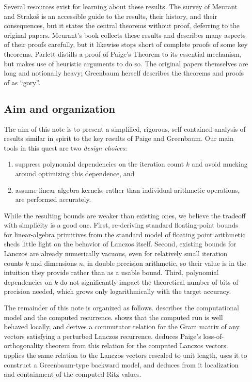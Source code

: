 Several resources exist for learning about these results.
The survey of Meurant and Strako\v{s} \cite{meurant_strakos2006} is an accessible guide to the results, their history, and their consequences, but it states the central theorems without proof, deferring to the original papers.
Meurant's book \cite{meurant2006} collects these results and describes many aspects of their proofs carefully, but it likewise stops short of complete proofs of some key theorems.
Parlett \cite{parlett1998} distills a proof of Paige's Theorem to its essential mechanism, but makes use of heuristic arguments to do so.
The original papers themselves are long and notionally heavy; Greenbaum herself describes the theorems and proofs of \cite{greenbaum1989} as ``gory''.

\subsection{Aim and organization}

The aim of this note is to present a simplified, rigorous, self-contained analysis of results similar in spirit to the key results of Paige and Greenbaum.
Our main tools in this quest are two \emph{design choices}:
\begin{enumerate}[label=(\roman*)]
  \item suppress polynomial dependencies on the iteration count $k$ and avoid mucking around optimizing this dependence, and
  \item assume linear-algebra kernels, rather than individual arithmetic operations, are performed accurately.
\end{enumerate}
While the resulting bounds are weaker than existing ones, we believe the tradeoff with simplicity is a good one.
First, re-deriving standard floating-point bounds for linear-algebra primitives from the standard model of floating point arithmetic sheds little light on the behavior of Lanczos itself.
Second, existing bounds for Lanczos are already numerically vacuous, even for relatively small iteration counts $k$ and dimensions $n$, in double precision arithmetic, so their value is in the intuition they provide rather than as a usable bound.
Third, polynomial dependencies on $k$ do not significantly impact the theoretical number of bits of precision needed, which grows only logarithmically with the target accuracy.


The remainder of this note is organized as follows.
 describes the computational model and the computed recurrence.
 shows that the computed run is well behaved locally, and derives a commutator relation for the Gram matrix of any vectors satisfying a perturbed Lanczos recurrence.
 deduces Paige's loss-of-orthogonality theorem from this relation for the computed Lanczos vectors.
 applies the same relation to the Lanczos vectors rescaled to unit length, uses it to construct a Greenbaum-type backward model, and deduces from it localization and containment of the computed Ritz values.

